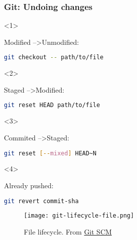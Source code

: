 \begin{frame}[fragile]

\frametitle{Git: Undoing changes}


\begin{onlyenv}<1>

Modified --\textgreater Unmodified:

\begin{lstlisting}[language=Bash]
git checkout -- path/to/file
\end{lstlisting}

\end{onlyenv}

\begin{onlyenv}<2>

Staged --\textgreater Modified:

\begin{lstlisting}[language=Bash]
git reset HEAD path/to/file
\end{lstlisting}

\end{onlyenv}

\begin{onlyenv}<3>

Commited --\textgreater Staged:

\begin{lstlisting}[language=Bash]
git reset [--mixed] HEAD~N
\end{lstlisting}

\end{onlyenv}

\begin{onlyenv}<4>

Already pushed:

\begin{lstlisting}[language=Bash]
git revert commit-sha
\end{lstlisting}

\end{onlyenv}


\begin{figure}
\centering
\texttt{[image: git-lifecycle-file.png]}
\caption{File lifecycle. From \href{https://git-scm.com/book/en/v2/Git-Basics-Recording-Changes-to-the-Repository}{Git SCM}}
\end{figure}

\end{frame}